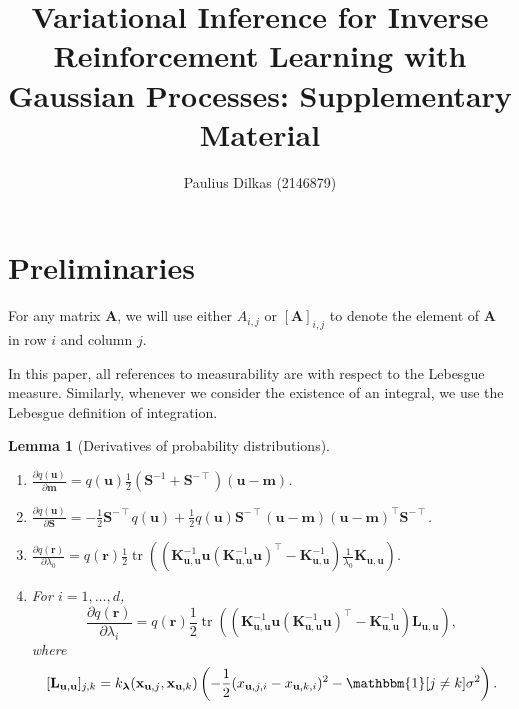 \documentclass{article}
\title{Variational Inference for Inverse Reinforcement Learning with Gaussian
  Processes: Supplementary Material}
\author{Paulius Dilkas (2146879)}
\newtheorem{lemma}[theorem]{Lemma}
\theoremstyle{definition}
\theoremstyle{remark}
\DeclareMathOperator{\tr}{tr}
\newcommand{\Kuu}{\mathbf{K}_{\mathbf{u},\mathbf{u}}}
\newcommand{\Luu}{\mathbf{L}_{\mathbf{u},\mathbf{u}}}
\begin{document}
\maketitle

\section{Preliminaries}

For any matrix $\mathbf{A}$, we will use either $A_{i,j}$ or
$[\mathbf{A}]_{i,j}$ to denote the element of $\mathbf{A}$ in row $i$ and column
$j$.

In this paper, all references to measurability are with respect to the Lebesgue
measure. Similarly, whenever we consider the existence of an integral, we use
the Lebesgue definition of integration.

\begin{lemma}[Derivatives of probability
  distributions] \label{lemma:derivatives}
  \begin{enumerate}
    \leavevmode
  \item $\frac{\partial q(\mathbf{u})}{\partial \mathbf{m}} =
    q(\mathbf{u})\frac{1}{2}(\mathbf{S}^{-1} +
    \mathbf{S}^{-\intercal})(\mathbf{u} - \mathbf{m})$.
  \item $\frac{\partial q(\mathbf{u})}{\partial \mathbf{S}} =
    -\frac{1}{2}\mathbf{S}^{-\intercal}q(\mathbf{u}) +
    \frac{1}{2}q(\mathbf{u})\mathbf{S}^{-\intercal}(\mathbf{u} -
    \mathbf{m})(\mathbf{u} - \mathbf{m})^\intercal\mathbf{S}^{-\intercal}$.
  \item $\frac{\partial q(\mathbf{r})}{\partial \lambda_0} =
    q(\mathbf{r})\frac{1}{2}\tr
    \left((\Kuu^{-1}\mathbf{u}(\Kuu^{-1}\mathbf{u})^\intercal - \Kuu^{-1})
      \frac{1}{\lambda_0}\Kuu \right)$.
  \item For $i = 1, \dots, d$,
    \[
      \frac{\partial q(\mathbf{r})}{\partial \lambda_i} =
      q(\mathbf{r})\frac{1}{2}\tr
      \left((\Kuu^{-1}\mathbf{u}(\Kuu^{-1}\mathbf{u})^\intercal - \Kuu^{-1})
        \Luu \right),
    \]
    where
    \[
      [\Luu]_{j,k} = k_{\bm\lambda}(\mathbf{x}_{\mathbf{u},j},
      \mathbf{x}_{\mathbf{u},k}) \left( -\frac{1}{2}(x_{\mathbf{u},j,i} -
        x_{\mathbf{u},k,i})^2 - \mathbbm{1}[j \ne k]\sigma^2 \right).
    \]
  \end{enumerate}
\end{lemma}
\end{document}
